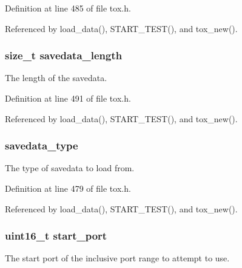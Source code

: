 Definition at line 485 of file tox.\+h.



Referenced by load\+\_\+data(), S\+T\+A\+R\+T\+\_\+\+T\+E\+S\+T(), and tox\+\_\+new().

\hypertarget{struct_tox___options_a56c7956bddcb0d100c54e426b6e5f3ed}{
\subsubsection[{savedata\+\_\+length}]{\setlength{\rightskip}{0pt plus 5cm}size\+\_\+t savedata\+\_\+length}}\label{struct_tox___options_a56c7956bddcb0d100c54e426b6e5f3ed}
The length of the savedata. 

Definition at line 491 of file tox.\+h.



Referenced by load\+\_\+data(), S\+T\+A\+R\+T\+\_\+\+T\+E\+S\+T(), and tox\+\_\+new().

\hypertarget{struct_tox___options_a825cfabf7be0224b12d09c8b1f5cbed6}{
\subsubsection[{savedata\+\_\+type}]{ savedata\+\_\+type}}\label{struct_tox___options_a825cfabf7be0224b12d09c8b1f5cbed6}
The type of savedata to load from. 

Definition at line 479 of file tox.\+h.



Referenced by load\+\_\+data(), S\+T\+A\+R\+T\+\_\+\+T\+E\+S\+T(), and tox\+\_\+new().

\hypertarget{struct_tox___options_aa2de2e9258608a29877ef5d5610ea8f7}{
\subsubsection[{start\+\_\+port}]{\setlength{\rightskip}{0pt plus 5cm}uint16\+\_\+t start\+\_\+port}}\label{struct_tox___options_aa2de2e9258608a29877ef5d5610ea8f7}
The start port of the inclusive port range to attempt to use.

